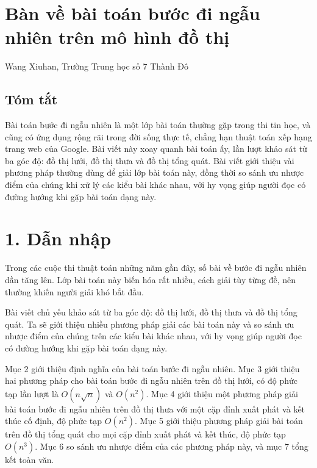 \documentclass[11pt]{article}
\begin{document}
\clearpage
\section*{Bàn về bài toán bước đi ngẫu nhiên trên mô hình đồ thị}

\begin{center}
Wang Xiuhan, Trường Trung học số 7 Thành Đô
\end{center}

\subsection*{Tóm tắt}

Bài toán bước đi ngẫu nhiên là một lớp bài toán thường gặp trong thi tin học,
và cũng có ứng dụng rộng rãi trong đời sống thực tế, chẳng hạn thuật toán xếp
hạng trang web của Google. Bài viết này xoay quanh bài toán ấy, lần lượt khảo
sát từ ba góc độ: đồ thị lưới, đồ thị thưa và đồ thị tổng quát. Bài viết giới
thiệu vài phương pháp thường dùng để giải lớp bài toán này, đồng thời so sánh
ưu nhược điểm của chúng khi xử lý các kiểu bài khác nhau, với hy vọng giúp
người đọc có đường hướng khi gặp bài toán dạng này.

\section*{1. Dẫn nhập}

Trong các cuộc thi thuật toán những năm gần đây, số bài về bước đi ngẫu nhiên
dần tăng lên. Lớp bài toán này biến hóa rất nhiều, cách giải tùy từng đề, nên
thường khiến người giải khó bắt đầu.

Bài viết chủ yếu khảo sát từ ba góc độ: đồ thị lưới, đồ thị thưa và đồ thị
tổng quát. Ta sẽ giới thiệu nhiều phương pháp giải các bài toán này và so sánh
ưu nhược điểm của chúng trên các kiểu bài khác nhau, với hy vọng giúp người
đọc có đường hướng khi gặp bài toán dạng này.

Mục 2 giới thiệu định nghĩa của bài toán bước đi ngẫu nhiên. Mục 3 giới thiệu
hai phương pháp cho bài toán bước đi ngẫu nhiên trên đồ thị lưới, có độ phức
tạp lần lượt là \(O(n\sqrt n)\) và \(O(n^2)\). Mục 4 giới thiệu một phương pháp
giải bài toán bước đi ngẫu nhiên trên đồ thị thưa với một cặp đỉnh xuất phát
và kết thúc cố định, độ phức tạp \(O(n^2)\). Mục 5 giới thiệu phương pháp giải
bài toán trên đồ thị tổng quát cho mọi cặp đỉnh xuất phát và kết thúc, độ phức
tạp \(O(n^3)\). Mục 6 so sánh ưu nhược điểm của các phương pháp này, và mục 7
tổng kết toàn văn.
\end{document}
